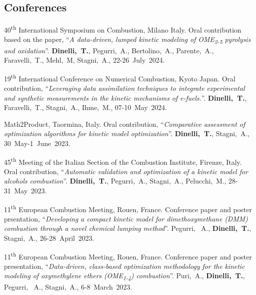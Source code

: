 \subsection{Conferences}
\begin{etaremune}
    \item
    40\textsuperscript{th} International Symposium on Combustion, Milano Italy. Oral
    contribution based on the paper, ``{\it A data-driven, lumped kinetic modeling of
    OME\textsubscript{2-5} pyrolysis and oxidation}''. {\bf Dinelli,~T.},
    Pegurri,~A., Bertolino,~A., Parente,~A., Faravelli,~T., Mehl,~M, Stagni,~A.,
    22-26~July~2024.

    \item
    19\textsuperscript{th} International Conference on Numerical Combustion, Kyoto
    Japan. Oral contribution, ``{\it Leveraging data assimilation techniques to
    integrate experimental and synthetic measurements in the kinetic mechanisms of
    e-fuels.}''. {\bf Dinelli,~T.}, Faravelli,~T., Stagni,~A., Ihme,~M.,
    07-10~May~2024.

    \item
    Math2Product, Taormina, Italy. Oral contribution, ``{\it Comparative
    assessment of optimization algorithms for kinetic model optimization}''.
    {\bf Dinelli,~T.}, Stagni,~A.,
    30~May-1~June~2023.

    \item
    45\textsuperscript{th} Meeting of the Italian Section of the Combustion Institute,
    Firenze, Italy. Oral contribution, ``{\it Automatic validation and optimization
    of a kinetic model for alcohols combustion}''. {\bf Dinelli,~T.},
    Pegurri,~A., Stagni,~A., Pelucchi,~M.,
    28-31~May~2023.

    \item
    11\textsuperscript{th} European Combustion Meeting, Rouen, France. Conference paper
    and poster prsentation, ``{\it Developing a compact kinetic model for
    dimethoxymethane (DMM) combustion through a novel chemical lumping method}''.
    Pegurri, ~A., {\bf Dinelli,~T.}, Stagni,~A.,
    26-28~April~2023.

    \item
    11\textsuperscript{th} European Combustion Meeting, Rouen, France. Conference paper
    and poster presentation, ``{\it Data-driven, class-based optimization methodology
    for the kinetic modeling of oxymethylene ethers (OME\textsubscript{1-4}) combustion}''.
    Puri,~A., {\bf Dinelli,~T.}, Pegurri, ~A., Stagni,~A.,
    6-8~March~2023.


\end{etaremune}
